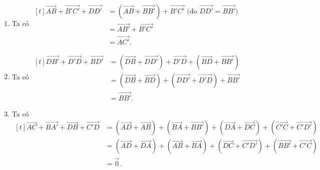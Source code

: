 \begin{bt}
{\begin{center}
		\end{center}
		\begin{enumerate}
			\item Ta có $\begin{aligned}[t]
				\overrightarrow{AB}+\overrightarrow{B'C'}+\overrightarrow{DD'} &=(\overrightarrow{AB}+\overrightarrow{BB'})+\overrightarrow{B'C'} \text{ (do } \overrightarrow{DD'}=\overrightarrow{BB'} \text{)} \\
				&=\overrightarrow{AB'}+\overrightarrow{B'C'}\\
				&=\overrightarrow{AC'}.
			\end{aligned}$
			\item Ta có $\begin{aligned}[t]
				\overrightarrow{DB'}+\overrightarrow{D'D}+\overrightarrow{BD'}	&=(\overrightarrow{DB}+\overrightarrow{DD'})+\overrightarrow{D'D}+(\overrightarrow{BD}+\overrightarrow{BB'})\\
				&=(\overrightarrow{DB}+\overrightarrow{BD})+(\overrightarrow{DD'}+\overrightarrow{D'D})+\overrightarrow{BB'}\\
				&=\overrightarrow{BB'}.
			\end{aligned}$
			\item Ta có $\begin{aligned}[t]
				\overrightarrow{AC}+\overrightarrow{BA'}+\overrightarrow{DB}+\overrightarrow{C'D}	&=(\overrightarrow{AD}+\overrightarrow{AB})+(\overrightarrow{BA}+\overrightarrow{BB'})+(\overrightarrow{DA}+\overrightarrow{DC})+(\overrightarrow{C'C}+\overrightarrow{C'D'})\\
				&=(\overrightarrow{AD}+\overrightarrow{DA})+(\overrightarrow{AB}+\overrightarrow{BA})+(\overrightarrow{DC}+\overrightarrow{C'D'})+(\overrightarrow{BB'}+\overrightarrow{C'C})\\
				&=\overrightarrow{0}.
			\end{aligned}$
		\end{enumerate}
	}
\end{bt}

